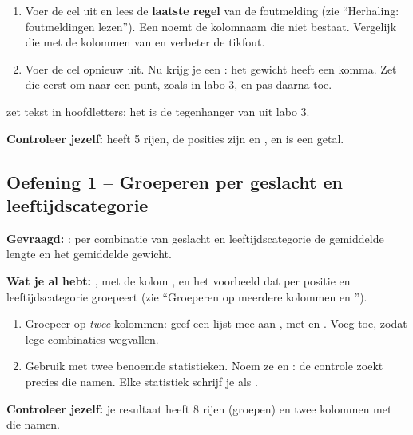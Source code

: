 \documentclass[11pt,a4paper]{article}
\begin{document}
\begin{enumerate}
  \item Voer de cel uit en lees de \textbf{laatste regel} van de
        foutmelding (zie ``Herhaling: foutmeldingen lezen''). Een
         noemt de kolomnaam die niet bestaat. Vergelijk die
        met de kolommen van  en verbeter de tikfout.
  \item Voer de cel opnieuw uit. Nu krijg je een : het
        gewicht  heeft een komma. Zet die eerst om naar een
        punt, zoals in labo 3, en pas daarna  toe.
\end{enumerate}

 zet tekst in hoofdletters; het is de tegenhanger van
 uit labo 3.

\textbf{Controleer jezelf:}  heeft 5 rijen, de posities
zijn  en , en  is een
getal.

\subsection*{Oefening 1 -- Groeperen per geslacht en leeftijdscategorie}

\textbf{Gevraagd:} : per combinatie van geslacht
en leeftijdscategorie de gemiddelde lengte en het gemiddelde gewicht.

\textbf{Wat je al hebt:} , met de kolom
, en het voorbeeld dat per positie en leeftijdscategorie
groepeert (zie ``Groeperen op meerdere kolommen en '').

\begin{enumerate}
  \item Groepeer op \emph{twee} kolommen: geef een lijst mee aan
        , met  en . Voeg
         toe, zodat lege combinaties wegvallen.
  \item Gebruik  met twee benoemde statistieken. Noem ze
         en : de controle
        zoekt precies die namen. Elke statistiek schrijf je als
        .
\end{enumerate}

\textbf{Controleer jezelf:} je resultaat heeft 8 rijen (groepen) en twee
kolommen met die namen.
\end{document}
